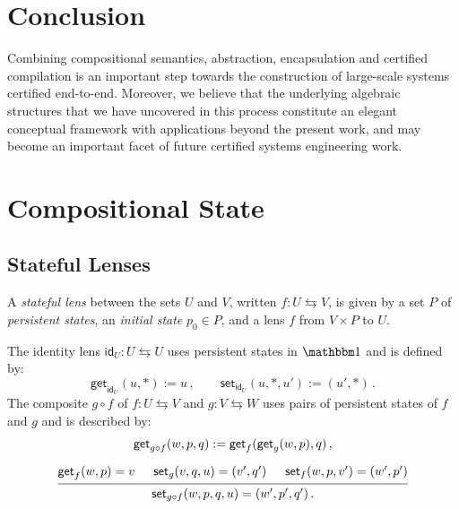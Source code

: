 \documentclass[acmsmall,screen,review,anonymous,nonacm]{acmart}
\newcommand{\kw}[1]{\ensuremath{ \mathsf{#1} }}
\begin{document}

\section{Conclusion} \label{sec:conclusion} %

Combining compositional semantics,
abstraction,
encapsulation and certified compilation
is an important step towards
the construction of large-scale systems certified end-to-end.
Moreover,
we believe that
the underlying algebraic structures that we have uncovered
in this process
constitute an elegant conceptual framework
with applications beyond the present work,
and may become an important facet of
future certified systems engineering work.




\ifdefined\withappendix

\appendix

\newpage

\section{Compositional State} %

\subsection{Stateful Lenses}

\begin{definition}
A \emph{stateful lens} between the sets $U$ and $V$,
written $f : U \leftrightarrows V$,
is given by a set $P$ of \emph{persistent states},
an \emph{initial state} $p_0 \in P$,
and a lens $f$ from $V \times P$ to $U$.

The identity lens $\kw{id}_U : U \leftrightarrows U$
uses persistent states in $\mathbbm1$ and is defined by:
\[
  \kw{get}_{\kw{id}_U}(u, *) := u
  \,,
  \qquad
  \kw{set}_{\kw{id}_U}(u, *, u') := (u', *)
  \,.
\]
The composite $g \circ f$ of
$f : U \leftrightarrows V$ and
$g : V \leftrightarrows W$
uses pairs of persistent states of $f$ and $g$ and
is described by:
\begin{gather*}
  \kw{get}_{g \circ f}(w, p, q) := \kw{get}_f(\kw{get}_g(w, p), q)
  \,,
  \\[1.5ex]
  \begin{prooftree}
    \hypo{\kw{get}_f(w, p) = v}
    \hypo{\kw{set}_g(v, q, u) = (v', q')}
    \hypo{\kw{set}_f(w, p, v') = (w', p')}
    \infer3{\kw{set}_{g \circ f}(w, p, q, u) = (w', p', q') \,.}
  \end{prooftree}
\end{gather*}
\end{definition}
\end{document}

